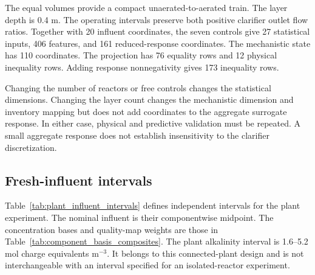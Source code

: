 The equal volumes provide a compact unaerated-to-aerated train. The layer depth is 0.4 m. The operating intervals preserve both positive clarifier outlet flow ratios. Together with 20 influent coordinates, the seven controls give 27 statistical inputs, 406 features, and 161 reduced-response coordinates. The mechanistic state has 110 coordinates. The projection has 76 equality rows and 12 physical inequality rows. Adding response nonnegativity gives 173 inequality rows.

Changing the number of reactors or free controls changes the statistical dimensions. Changing the layer count changes the mechanistic dimension and inventory mapping but does not add coordinates to the aggregate surrogate response. In either case, physical and predictive validation must be repeated. A small aggregate response does not establish insensitivity to the clarifier discretization.

\subsection{Fresh-influent intervals}

Table~\ref{tab:plant_influent_intervals} defines independent intervals for the plant experiment. The nominal influent is their componentwise midpoint. The concentration bases and quality-map weights are those in Table~\ref{tab:component_basis_composites}. The plant alkalinity interval is 1.6--5.2 mol charge equivalents m$^{-3}$. It belongs to this connected-plant design and is not interchangeable with an interval specified for an isolated-reactor experiment.

